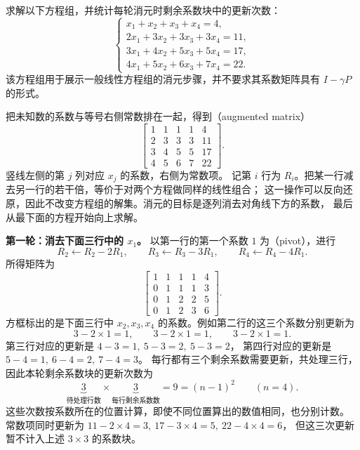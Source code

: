\documentclass[UTF8,12pt,a4paper,fontset=fandol]{ctexart}
\begin{document}
\begin{example}
求解以下方程组，并统计每轮消元时剩余系数块中的更新次数：
\begin{equation}
  \begin{cases}
    x_1+x_2+x_3+x_4=4,\\
    2x_1+3x_2+3x_3+3x_4=11,\\
    3x_1+4x_2+5x_3+5x_4=17,\\
    4x_1+5x_2+6x_3+7x_4=22.
  \end{cases}
  \label{eq:four-variable-system}
\end{equation}
该方程组用于展示一般线性方程组的消元步骤，并不要求其系数矩阵具有 $I-\gamma P$ 的形式。
\end{example}

\begin{solve}
把未知数的系数与等号右侧常数排在一起，得到（augmented matrix）
\[
  \left[
  \begin{array}{cccc|c}
    1&1&1&1&4\\
    2&3&3&3&11\\
    3&4&5&5&17\\
    4&5&6&7&22
  \end{array}
  \right].
\]
竖线左侧的第 $j$ 列对应 $x_j$ 的系数，右侧为常数项。
记第 $i$ 行为 $R_i$。把某一行减去另一行的若干倍，等价于对两个方程做同样的线性组合；
这一操作可以反向还原，因此不改变方程组的解集。消元的目标是逐列消去对角线下方的系数，
最后从最下面的方程开始向上求解。

\textbf{第一轮：消去下面三行中的 $x_1$。}
以第一行的第一个系数 $1$ 为（pivot），进行
\[
  R_2\leftarrow R_2-2R_1,\qquad
  R_3\leftarrow R_3-3R_1,\qquad
  R_4\leftarrow R_4-4R_1.
\]
所得矩阵为
\begin{equation}
  \left[
  \begin{array}{cccc|c}
    1&1&1&1&4\\
    0&\boxed{1}&\boxed{1}&\boxed{1}&3\\
    0&\boxed{1}&\boxed{2}&\boxed{2}&5\\
    0&\boxed{1}&\boxed{2}&\boxed{3}&6
  \end{array}
  \right].
  \label{eq:elimination-first-round}
\end{equation}
方框标出的是下面三行中 $x_2,x_3,x_4$ 的系数。例如第二行的这三个系数分别更新为
\[
  3-2\times1=1,\qquad 3-2\times1=1,\qquad 3-2\times1=1.
\]
第三行对应的更新是 $4-3=1,\ 5-3=2,\ 5-3=2$，
第四行对应的更新是 $5-4=1,\ 6-4=2,\ 7-4=3$。
每行都有三个剩余系数需要更新，共处理三行，因此本轮剩余系数块的更新次数为
\[
  \underbrace{3}_{\text{待处理行数}}
  \times\underbrace{3}_{\text{每行剩余系数数}}
  =9=(n-1)^2\qquad(n=4).
\]
这些次数按系数所在的位置计算，即使不同位置算出的数值相同，也分别计数。
常数项同时更新为 $11-2\times4=3,\ 17-3\times4=5,\ 22-4\times4=6$，
但这三次更新暂不计入上述 $3\times3$ 的系数块。


\end{solve}
\end{document}
